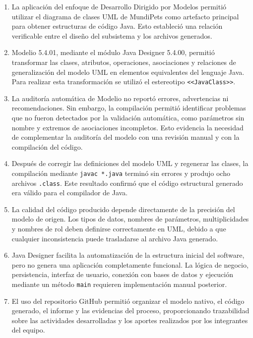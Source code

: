 \documentclass[10pt,a4paper,openany]{report}
\begin{document}
	\begin{enumerate}
		
		\item La aplicación del enfoque de Desarrollo Dirigido por Modelos
		permitió utilizar el diagrama de clases UML de MundiPets como
		artefacto principal para obtener estructuras de código Java. Esto
		estableció una relación verificable entre el diseño del subsistema y
		los archivos generados.
		
		\item Modelio 5.4.01, mediante el módulo Java Designer 5.4.00,
		permitió transformar las clases, atributos, operaciones,
		asociaciones y relaciones de generalización del modelo UML en
		elementos equivalentes del lenguaje Java. Para realizar esta
		transformación se utilizó el estereotipo
		\texttt{\textless\textless JavaClass\textgreater\textgreater}.
		
		\item La auditoría automática de Modelio no reportó errores,
		advertencias ni recomendaciones. Sin embargo, la compilación permitió
		identificar problemas que no fueron detectados por la validación
		automática, como parámetros sin nombre y extremos de asociaciones
		incompletos. Esto evidencia la necesidad de complementar la auditoría
		del modelo con una revisión manual y con la compilación del código.
		
		\item Después de corregir las definiciones del modelo UML y regenerar
		las clases, la compilación mediante \texttt{javac *.java} terminó sin
		errores y produjo ocho archivos \texttt{.class}. Este resultado
		confirmó que el código estructural generado era válido para el
		compilador de Java.
		
		\item La calidad del código producido depende directamente de la
		precisión del modelo de origen. Los tipos de datos, nombres de
		parámetros, multiplicidades y nombres de rol deben definirse
		correctamente en UML, debido a que cualquier inconsistencia puede
		trasladarse al archivo Java generado.
		
		\item Java Designer facilita la automatización de la estructura
		inicial del software, pero no genera una aplicación completamente
		funcional. La lógica de negocio, persistencia, interfaz de usuario,
		conexión con bases de datos y ejecución mediante un método
		\texttt{main} requieren implementación manual posterior.
		
		\item El uso del repositorio GitHub permitió organizar el modelo
		nativo, el código generado, el informe y las evidencias del proceso,
		proporcionando trazabilidad sobre las actividades desarrolladas y los
		aportes realizados por los integrantes del equipo.
		
	\end{enumerate}
	
\end{document}
